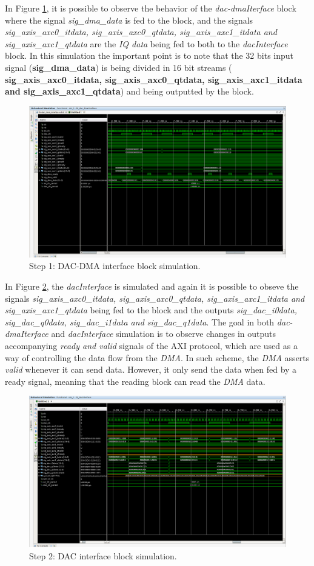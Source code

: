 In Figure \ref{fig:simdacdma}, it is possible to observe the behavior of the
\textit{dac-dmaIterface} block where the signal \textit{sig\_dma\_data} is fed
to the block, and the signals \textit{ sig\_axis\_axc0\_itdata,
sig\_axis\_axc0\_qtdata, sig\_axis\_axc1\_itdata and sig\_axis\_axc1\_qtdata}
are the \textit{IQ data} being fed to both to the \textit{dacInterface} block.
In this simulation the important point is to note that the 32 bits input signal
(\textbf{sig\_dma\_data}) is being divided in 16 bit streams (\textbf{
sig\_axis\_axc0\_itdata, sig\_axis\_axc0\_qtdata, sig\_axis\_axc1\_itdata and
sig\_axis\_axc1\_qtdata}) and being outputted by the block.

\begin{figure}[htbp]
    \centering
    \includegraphics[height=.3\textwidth, width=.85\textwidth,
    trim={{.13\textwidth} {.90\textwidth} {.05\textwidth} {.15\textwidth}},
    clip]{./figures/dac_dmaInterface}
    \caption{ Step 1: DAC-DMA interface block simulation.
    \label{fig:simdacdma}}
\end{figure}

 In Figure \ref{fig:simdac}, the \textit{dacInterface} is simulated and again it
 is possible to obseve the signals \textit{sig\_axis\_axc0\_itdata,
 sig\_axis\_axc0\_qtdata, sig\_axis\_axc1\_itdata and sig\_axis\_axc1\_qtdata}
 being fed to the block and the outputs \textit{sig\_dac\_i0data,
 sig\_dac\_q0data, sig\_dac\_i1data and sig\_dac\_q1data}. The goal in both
 \textit{dac-dmaIterface} and \textit{dacInterface} simulation is to observe
 changes in outputs accompanying \textit{ready and valid} signals of the AXI
 protocol, which are used as a way of controlling the data flow from the
 \textit{DMA}. In such scheme, the \textit{DMA} asserts \textit{valid} whenever
 it can send data. However, it only send the data when fed by a ready signal,
 meaning that the reading block can read the \textit{DMA} data.

\begin{figure}[htbp]
    \centering
    \includegraphics[height=.4\textwidth, width=1\textwidth,
    trim={{.13\textwidth} {.8\textwidth} {.05\textwidth} {.15\textwidth}},
    clip]{./figures/dacInterface}
    \caption{ Step 2: DAC interface block simulation.
    \label{fig:simdac}}
\end{figure}

